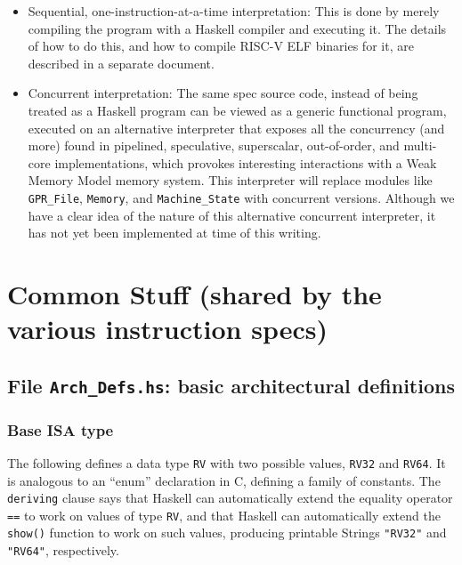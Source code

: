 \documentclass[11pt]{article}
\begin{document}
\begin{itemize}

\item Sequential, one-instruction-at-a-time interpretation: This is
done by merely compiling the program with a Haskell compiler and
executing it.  The details of how to do this, and how to compile
RISC-V ELF binaries for it, are described in a separate document.

\item Concurrent interpretation: The same spec source code, instead of
being treated as a Haskell program can be viewed as a generic
functional program, executed on an alternative interpreter that
exposes all the concurrency (and more) found in pipelined,
speculative, superscalar, out-of-order, and multi-core
implementations, which provokes interesting interactions with a Weak
Memory Model memory system.  This interpreter will replace modules
like \verb|GPR_File|, \verb|Memory|, and \verb|Machine_State| with
concurrent versions.  Although we have a clear idea of the nature of
this alternative concurrent interpreter, it has not yet been
implemented at time of this writing.

\end{itemize}


\section{Common Stuff (shared by the various instruction specs)}


\subsection{File {\tt Arch\_Defs.hs}: basic architectural definitions}

\label{sec_arch_defs}


\subsubsection{Base ISA type}

The following defines a data type {\tt RV} with two possible values,
{\tt RV32} and {\tt RV64}.  It is analogous to an ``enum'' declaration
in C, defining a family of constants.  The {\tt deriving} clause says
that Haskell can automatically extend the equality operator {\tt ==}
to work on values of type {\tt RV}, and that Haskell can automatically
extend the {\tt show()} function to work on such values, producing
printable Strings {\tt "RV32"} and {\tt "RV64"}, respectively.
\end{document}
